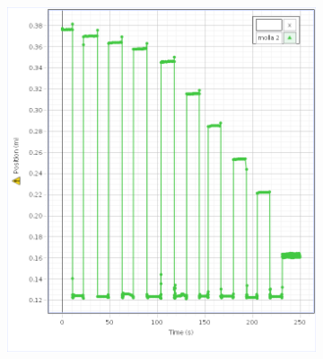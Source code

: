 \documentclass[a4paper]{article}
\theoremstyle{definition}
\begin{document}
\begin{figure}[!htbp]
{{	\begin{subfigure}{0.7\textwidth}
		\includegraphics[scale=0.45]{capstone_data/statica/molla2.png}
	\end{subfigure}%
		}
	}
\end{figure}
\end{document}
